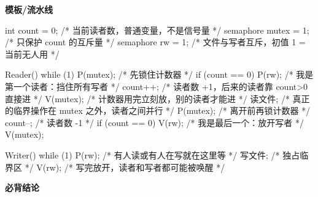 \documentclass[10pt,a4paper]{ctexart}
\begin{document}

\textbf{模板/流水线}

\begin{codebox}
int count = 0;                 /* 当前读者数，普通变量，不是信号量 */
semaphore mutex = 1;           /* 只保护 count 的互斥量 */
semaphore rw    = 1;           /* 文件与写者互斥，初值 1 = 当前无人用 */

Reader() { while (1) {
    P(mutex);                  /* 先锁住计数器 */
    if (count == 0) P(rw);     /* 我是第一个读者：挡住所有写者 */
    count++;                   /* 读者数 +1，后来的读者靠 count>0 直接进 */
    V(mutex);                  /* 计数器用完立刻放，别的读者才能进 */
    读文件;                    /* 真正的临界操作在 mutex 之外，读者之间并行 */
    P(mutex);                  /* 离开前再锁计数器 */
    count--;                   /* 读者数 -1 */
    if (count == 0) V(rw);     /* 我是最后一个：放开写者 */
    V(mutex);
} }

Writer() { while (1) {
    P(rw);                     /* 有人读或有人在写就在这里等 */
    写文件;                    /* 独占临界区 */
    V(rw);                     /* 写完放开，读者和写者都可能被唤醒 */
} }
\end{codebox}




\textbf{必背结论}
\end{document}

